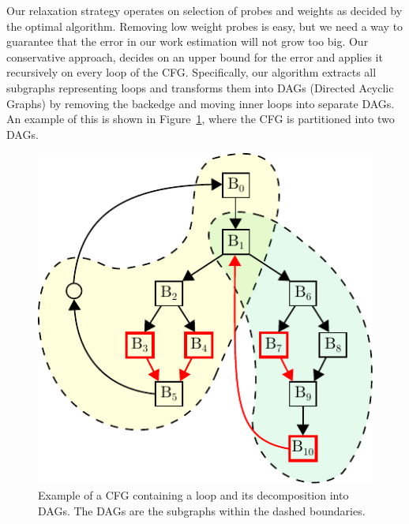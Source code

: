 Our relaxation strategy operates on selection of probes and weights as decided by the optimal algorithm. Removing low weight probes is
easy, but we need a way to guarantee that the error in our work estimation will not grow too big. Our conservative approach, decides on an
upper bound for the error and applies it recursively on every loop of the CFG. Specifically, our algorithm extracts all subgraphs
representing loops and transforms them into DAGs (Directed Acyclic Graphs) by removing the backedge and moving inner loops into separate
DAGs. An example of this is shown in Figure~\ref{fig:cfg-relax-example}, where the CFG is partitioned into two DAGs.


\begin{figure}[t]
  \centering
  \includegraphics[scale=0.75]{figs/cfg-relax-example.pdf}
  \caption{Example of a CFG containing a loop and its decomposition into DAGs.
           The DAGs are the subgraphs within the dashed boundaries.}
  \label{fig:cfg-relax-example}
\end{figure}

